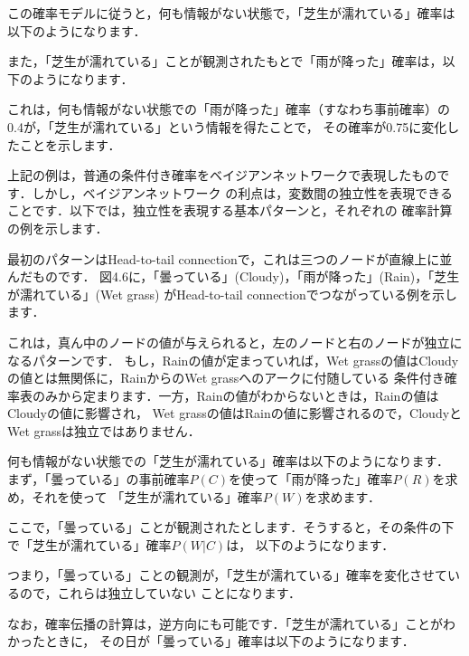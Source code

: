 この確率モデルに従うと，何も情報がない状態で，「芝生が濡れている」確率は以下のようになります．


また，「芝生が濡れている」ことが観測されたもとで「雨が降った」確率は，以下のようになります．


これは，何も情報がない状態での「雨が降った」確率（すなわち事前確率）の0.4が，「芝生が濡れている」という情報を得たことで，
その確率が0.75に変化したことを示します．


上記の例は，普通の条件付き確率をベイジアンネットワークで表現したものです．しかし，ベイジアンネットワーク
の利点は，変数間の独立性を表現できることです．以下では，独立性を表現する基本パターンと，それぞれの
確率計算の例を示します．

最初のパターンはHead-to-tail connectionで，これは三つのノードが直線上に並んだものです．
図4.6に，「曇っている」(Cloudy)，「雨が降った」(Rain)，「芝生が濡れている」(Wet grass)
がHead-to-tail connectionでつながっている例を示します．


これは，真ん中のノードの値が与えられると，左のノードと右のノードが独立になるパターンです．
もし，Rainの値が定まっていれば，Wet grassの値はCloudyの値とは無関係に，RainからのWet grassへのアークに付随している
条件付き確率表のみから定まります．一方，Rainの値がわからないときは，Rainの値はCloudyの値に影響され，
Wet grassの値はRainの値に影響されるので，CloudyとWet grassは独立ではありません．

何も情報がない状態での「芝生が濡れている」確率は以下のようになります．
まず，「曇っている」の事前確率$P(C)$を使って「雨が降った」確率$P(R)$を求め，それを使って
「芝生が濡れている」確率$P(W)$を求めます．


ここで，「曇っている」ことが観測されたとします．そうすると，その条件の下で「芝生が濡れている」確率$P(W|C)$は，
以下のようになります．


つまり，「曇っている」ことの観測が，「芝生が濡れている」確率を変化させているので，これらは独立していない
ことになります．

なお，確率伝播の計算は，逆方向にも可能です．「芝生が濡れている」ことがわかったときに，
その日が「曇っている」確率は以下のようになります．



